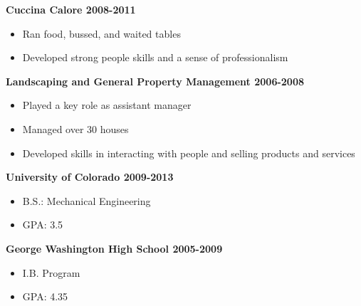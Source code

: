 \documentclass[11pt]{article} %
\begin{document}
\bigskip


\noindent \centerline{\large \bf Cuccina Calore \hfill 2008-2011}
\begin{itemize}
  \item Ran food, bussed, and waited tables
  \item Developed strong people skills and a sense of professionalism
\end{itemize}


\bigskip


\noindent \centerline{\large \bf Landscaping and General Property Management \hfill 2006-2008}
\begin{itemize}
  \item Played a key role as assistant manager
  \item Managed over 30 houses
  \item Developed skills in interacting with people and selling products and services
\end{itemize}


\bigskip


\medskip


\noindent \centerline{\large \bf University of Colorado \hfill 2009-2013}
\begin{itemize}
  \item B.S.: Mechanical Engineering
  \item GPA: 3.5
\end{itemize}


\noindent \centerline{\large \bf George Washington High School \hfill 2005-2009}
\begin{itemize}
  \item I.B. Program
  \item GPA: 4.35
\end{itemize}
\end{document}
